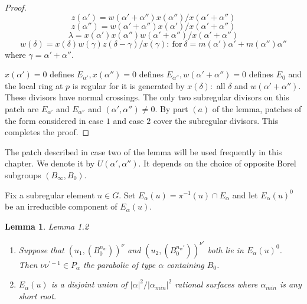 \documentclass{memo-l}
\newtheorem{lemma}[theorem]{Lemma}
\theoremstyle{definition}
\theoremstyle{remark}
\numberwithin{section}{chapter}
\numberwithin{equation}{chapter}
\begin{document}
\begin{proof}
$$
z({\alpha}')  =  w({\alpha}'+{\alpha''})x({\alpha''})/x({\alpha}'+{\alpha''})
$$
$$
z({\alpha''})  =  w({\alpha}'+{\alpha''})x({\alpha}')/x({\alpha}'+{\alpha}'')
$$
$$
{\lambda}  = 
x({\alpha}')x({\alpha}'')w({\alpha}'+{\alpha}'')/x({\alpha}'+{\alpha}'')
$$
$$
w({\delta})  =  x({\delta})w({\gamma})z({\delta}-{\gamma})/x({\gamma}):\ 
{\text{for}}\ {\delta}  =  m({\alpha}'){\alpha}'+m({\alpha''}){\alpha''}
$$
where ${\gamma}  =  {\alpha}'+{\alpha''}$.



$x({\alpha}')  =  0$ defines $E_{{\alpha}'}, x({\alpha''})  =  0$ defines
$E_{{\alpha}''}, w({\alpha}'+{\alpha''})  =  0$ defines $E_{0}$ and the local ring
at $p$ is regular for it is generated by $x({\delta}) :$ all ${\delta}$ and
$w({\alpha}'+{\alpha''})$.  These divisors have normal crossings.  The only
two subregular divisors on this patch are $E_{{\alpha}'}$ and
$E_{{\alpha}''}$ and $({\alpha}',{\alpha''}) \ne 0$.  By part $(a)$ of the
lemma, patches of the form considered in case $1$ and case $2$ cover the
subregular divisors.  This completes the proof.
\end{proof} 
{\medskip}

   The patch described in case two of the lemma will be used frequently in
this chapter.  We denote it by $U({\alpha}',{\alpha''})$.  It depends on the
choice of opposite Borel subgroups $(B_{{\infty}},B_{0})$.

   Fix a subregular element $u \in G$.  Set $E_{{\alpha}}(u)  = 
{\pi}^{-1}(u) \cap E_{{\alpha}}$ and let $E_{{\alpha}}(u)^{0}$ be an
irreducible component of $E_{{\alpha}}(u)$.

\begin{lemma}{Lemma 1.2}
\begin{enumerate}[label=\alph*)]
\item Suppose that $(u_{1},(B_{0}^{n_w}))^\nu$ and
$(u_{2},(B_{0}^{n_w'}))^{\nu'}$ both lie in
$E_{{\alpha}}(u)^{0}$.  Then ${\nu}{\nu}^{\prime-1} \in P_{{\alpha}}$ the
parabolic of type ${\alpha}$ containing $B_{0}$.
\item $E_{{\alpha}}(u)$ is a disjoint union of $\vert {\alpha}\vert ^{2}/\vert
{\alpha}_{min}\vert ^{2}$ rational surfaces where ${\alpha}_{min}$ is any
short root.
\end{enumerate}
\end{lemma}

\medpagebreak
\end{document}
